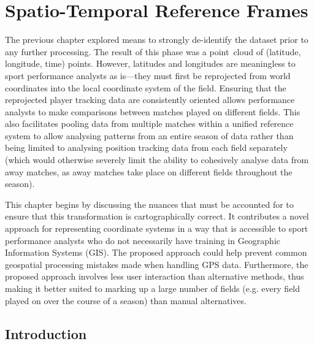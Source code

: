 \chapter{Spatio-Temporal Reference Frames}
\label{ch:spat-trans}
\startchapter


The previous chapter explored means to strongly de-identify the dataset prior to any further processing. The result of this phase was a point~cloud of (latitude, longitude, time) points. However, latitudes and longitudes are meaningless to sport performance analysts as is---they must first be reprojected from world coordinates into the local coordinate system of the field. Ensuring that the reprojected player tracking data are consistently oriented allows performance analysts to make comparisons between matches played on different fields. This also facilitates pooling data from multiple matches within a unified reference system to allow analysing patterns from an entire season of data rather than being limited to analysing position tracking data from each field separately (which would otherwise severely limit the ability to cohesively analyse data from away matches, as away matches take place on different fields throughout the season).

This chapter begins by discussing the nuances that must be accounted for to ensure that this transformation is cartographically correct. It contributes a novel approach for representing coordinate systems in a way that is accessible to sport performance analysts who do not necessarily have training in Geographic Information Systems (GIS). The proposed approach could help prevent common geospatial processing mistakes made when handling GPS data. Furthermore, the proposed approach involves less user interaction than alternative methods, thus making it better suited to marking up a large number of fields (e.g. every field played on over the course of a season) than manual alternatives.

\section{Introduction}\label{introduction}


